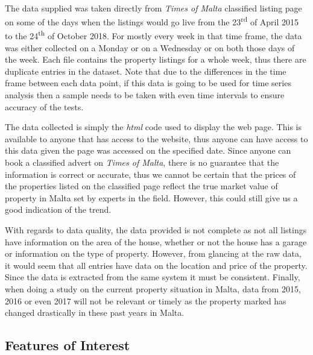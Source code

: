 \documentclass[12pt]{report}
\begin{document}
	\paragraph{ }The data supplied was taken directly from \textit{Times of Malta} classified listing page on some of the days when the listings would go live from the 23\textsuperscript{rd} of April 2015 to the 24\textsuperscript{th} of October 2018. For mostly every week in that time frame, the data was either collected on a Monday or on a Wednesday or on both those days of the week. Each file contains the property listings for a whole week, thus there are duplicate entries in the dataset. Note that due to the differences in the time frame between each data point, if this data is going to be used for time series analysis then a sample needs to be taken with even time intervals to ensure accuracy of the tests.
	
	\par The data collected is simply the \textit{html} code used to display the web page. This is available to anyone that has access to the website, thus anyone can have access to this data given the page was accessed on the specified date. Since anyone can book a classified advert on \textit{Times of Malta}, there is no guarantee that the information is correct or accurate, thus we cannot be certain that the prices of the properties listed on the classified page reflect the true market value of property in Malta set by experts in the field. However, this could still give us a good indication of the trend. 
	
	\par With regards to data quality, the data provided is not complete as not all listings have information on the area of the house, whether or not the house has a garage or information on the type of property. However, from glancing at the raw data, it would seem that all entries have data on the location and price of the property. Since the data is extracted from the same system it must be consistent. Finally, when doing a study on the current property situation in Malta, data from 2015, 2016 or even 2017 will not be relevant or timely as the property marked has changed drastically in these past years in Malta. 
	
	\subsection{Features of Interest}
\end{document}
